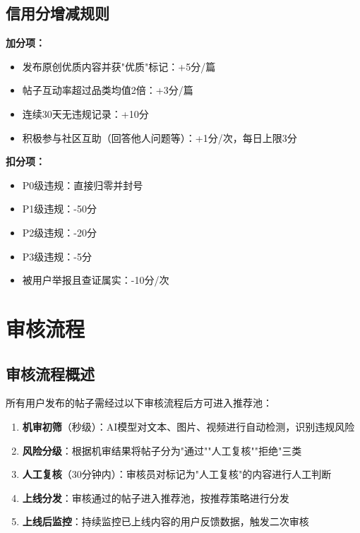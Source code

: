 \documentclass[a4paper,12pt]{article}
\begin{document}
\subsection{信用分增减规则}

\textbf{加分项：}
\begin{itemize}[noitemsep]
  \item 发布原创优质内容并获"优质"标记：+5分/篇
  \item 帖子互动率超过品类均值2倍：+3分/篇
  \item 连续30天无违规记录：+10分
  \item 积极参与社区互助（回答他人问题等）：+1分/次，每日上限3分
\end{itemize}

\textbf{扣分项：}
\begin{itemize}[noitemsep]
  \item P0级违规：直接归零并封号
  \item P1级违规：-50分
  \item P2级违规：-20分
  \item P3级违规：-5分
  \item 被用户举报且查证属实：-10分/次
\end{itemize}

\section{审核流程}

\subsection{审核流程概述}

所有用户发布的帖子需经过以下审核流程后方可进入推荐池：

\begin{enumerate}[noitemsep]
  \item \textbf{机审初筛}（秒级）：AI模型对文本、图片、视频进行自动检测，识别违规风险
  \item \textbf{风险分级}：根据机审结果将帖子分为"通过""人工复核""拒绝"三类
  \item \textbf{人工复核}（30分钟内）：审核员对标记为"人工复核"的内容进行人工判断
  \item \textbf{上线分发}：审核通过的帖子进入推荐池，按推荐策略进行分发
  \item \textbf{上线后监控}：持续监控已上线内容的用户反馈数据，触发二次审核
\end{enumerate}
\end{document}
